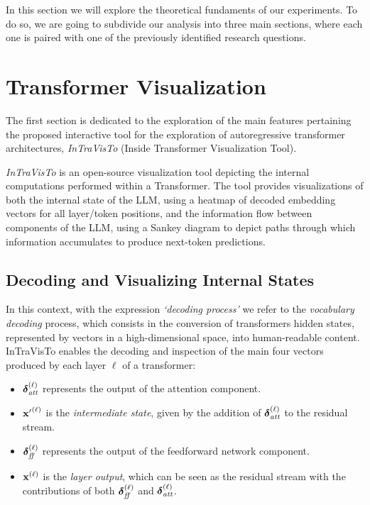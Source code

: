 In this section we will explore the theoretical fundaments of our experiments.
To do so, we are going to subdivide our analysis into three main sections, where each one is paired with one of the previously identified research questions.

\section{Transformer Visualization}

The first section is dedicated to the exploration of the main features pertaining the proposed interactive tool for the exploration of autoregressive transformer architectures, \emph{InTraVisTo} (Inside Transformer Visualization Tool).


    \emph{InTraVisTo} is an open-source visualization tool depicting the internal computations performed within a Transformer.
    The tool provides visualizations of both the internal state of the LLM, using a heatmap of decoded embedding vectors for all layer/token positions, and the information flow between components of the LLM, using a Sankey diagram to depict paths through which information accumulates to produce next-token predictions.

\subsection{Decoding and Visualizing Internal States}

    In this context, with the expression \emph{`decoding process'} we refer to the \emph{vocabulary decoding} process, which consists in the conversion of transformers hidden states, represented by vectors in a high-dimensional space, into human-readable content.
    InTraVisTo enables the decoding and inspection of the main four vectors produced by each layer $\ell$ of a transformer:
    \begin{itemize}
        \item $\bm{\mathbf{\delta}}_\textit{att}^{(\ell)}$ represents the output of the attention component.
        \item ${\bm{\mathbf{x}}'}^{(\ell)}$ is the \emph{intermediate state}, given by the addition of $\bm{\mathbf{\delta}}_\textit{att}^{(\ell)}$ to the residual stream.
        \item $\bm{\mathbf{\delta}}_\textit{ff}^{(\ell)}$ represents the output of the feedforward network component.
        \item $\bm{\mathbf{x}}^{(\ell)}$ is the \emph{layer output}, which can be seen as the residual stream with the contributions of both $\bm{\mathbf{\delta}}_\textit{ff}^{(\ell)}$ and $\bm{\mathbf{\delta}}_\textit{att}^{(\ell)}$.
    \end{itemize}

